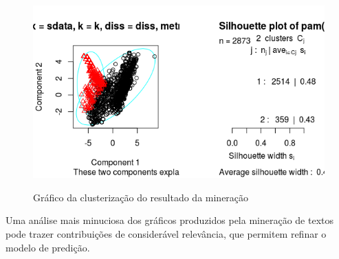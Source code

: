 \begin{figure}
\centering
\caption{Gráfico da clusterização do resultado da mineração}
\includegraphics[width=0.7\linewidth]{Figuras/Twitter/Cluster2}
\label{fig:Cluster2}
\end{figure}

Uma análise mais minuciosa dos gráficos produzidos pela mineração de textos pode trazer contribuições de considerável relevância, que permitem refinar o modelo de predição.


